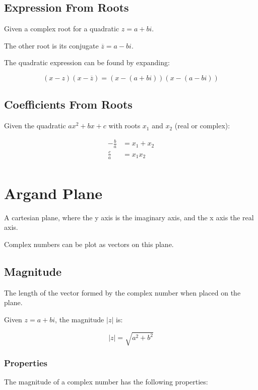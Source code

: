 \documentclass[a4paper,11pt]{article}
\begin{document}
\subsection{Expression From Roots}

Given a complex root for a quadratic $z = a + bi$.

The other root is its conjugate $\overline{z} = a - bi$.

The quadratic expression can be found by expanding:

$$
(x - z)(x - \overline{z}) = (x - (a + bi))(x - (a - bi))
$$


\subsection{Coefficients From Roots}

Given the quadratic $ax^2 + bx + c$ with roots $x_1$ and $x_2$ (real or
complex):

$$
\begin{aligned}
-\frac{b}{a} & = x_1 + x_2 \\
\frac{c}{a} & = x_1 x_2 \\
\end{aligned}
$$




\section{Argand Plane}

A cartesian plane, where the y axis is the imaginary axis, and the x axis the
real axis.

Complex numbers can be plot as vectors on this plane.


\subsection{Magnitude}

The length of the vector formed by the complex number when placed on the plane.

Given $z = a + bi$, the magnitude $\lvert z \rvert$ is:

$$
\lvert z \rvert = \sqrt{a^2 + b^2}
$$


\subsubsection{Properties}

The magnitude of a complex number has the following properties:
\end{document}
